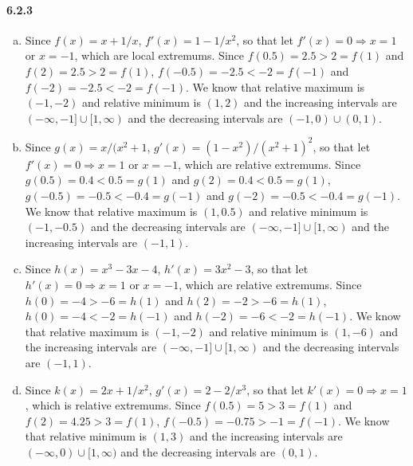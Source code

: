 \documentclass[11pt]{article}
\begin{document}
	\paragraph{6.2.3}
		\begin{enumerate}[(a)]
			\item Since $f(x) = x + 1/x$, $f'(x) = 1 - 1/x^2$, so that let $f'(x) = 0 \Rightarrow x = 1$ or $x = -1$, which are local extremums. Since $f(0.5) = 2.5 > 2 = f(1)$ and $f(2) = 2.5 > 2 = f(1)$, $f(-0.5) = -2.5 < -2 = f(-1)$ and $f(-2) = -2.5 < -2 = f(-1)$. We know that relative maximum is $(-1, -2)$ and relative minimum is $(1, 2)$ and the increasing intervals are $(-\infty, -1] \cup [1, \infty)$ and the decreasing intervals are $(-1, 0) \cup (0, 1)$.
			\item Since $g(x) = x/(x^2 + 1$, $g'(x) = (1 - x^2)/(x^2 + 1)^2$, so that let $f'(x) = 0 \Rightarrow x = 1$ or $x = -1$, which are relative extremums. Since $g(0.5) = 0.4 < 0.5 = g(1)$ and $g(2) = 0.4 < 0.5 = g(1)$, $g(-0.5) = -0.5 < -0.4 = g(-1)$ and $g(-2) = -0.5 < -0.4 = g(-1)$. We know that relative maximum is $(1, 0.5)$ and relative minimum is $(-1, -0.5)$ and the decreasing intervals are $(-\infty, -1] \cup [1, \infty)$ and the increasing intervals are $(-1, 1)$.
			\item Since $h(x) = x^3 - 3x - 4$, $h'(x) = 3x^2 - 3$, so that let $h'(x) = 0 \Rightarrow x = 1$ or $x = -1$, which are relative extremums. Since $h(0) = -4 > -6 = h(1)$ and $h(2) = -2 > -6 = h(1)$, $h(0) = -4 < -2 = h(-1)$ and $h(-2) = -6 < -2 = h(-1)$. We know that relative maximum is $(-1, -2)$ and relative minimum is $(1, -6)$ and the increasing intervals are $(-\infty, -1] \cup [1, \infty)$ and the decreasing intervals are $(-1, 1)$.
			\item Since $k(x) = 2x + 1/x^2$, $g'(x) = 2 - 2/x^3$, so that let $k'(x) = 0 \Rightarrow x = 1$, which is relative extremums. Since $f(0.5) = 5 > 3 = f(1)$ and $f(2) = 4.25 > 3 = f(1)$, $f(-0.5) = -0.75 > -1 = f(-1)$. We know that relative minimum is $(1, 3)$ and the increasing intervals are $(-\infty, 0) \cup [1, \infty)$ and the decreasing intervals are $(0, 1)$.
		\end{enumerate}
\end{document}
